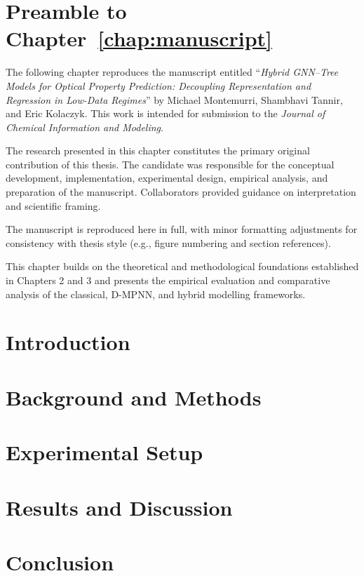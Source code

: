 \section*{Preamble to Chapter~\ref{chap:manuscript}}

The following chapter reproduces the manuscript entitled
``\textit{Hybrid GNN–Tree Models for Optical Property Prediction: Decoupling Representation and Regression in Low-Data Regimes}'' 
by Michael Montemurri, Shambhavi Tannir, and Eric Kolaczyk. 
This work is intended for submission to the \textit{Journal of Chemical Information and Modeling}.

The research presented in this chapter constitutes the primary original contribution of this thesis. The candidate was responsible for the conceptual development, implementation, experimental design, empirical analysis, and preparation of the manuscript. Collaborators provided guidance on interpretation and scientific framing.

The manuscript is reproduced here in full, with minor formatting adjustments for consistency with thesis style (e.g., figure numbering and section references). 

This chapter builds on the theoretical and methodological foundations established in Chapters 2 and 3 and presents the empirical evaluation and comparative analysis of the classical, D-MPNN, and hybrid modelling frameworks.

\section{Introduction}


\section{Background and Methods}
\label{sec:methods}


\section{Experimental Setup}
\label{sec:experiments}


\section{Results and Discussion}


\section{Conclusion}


